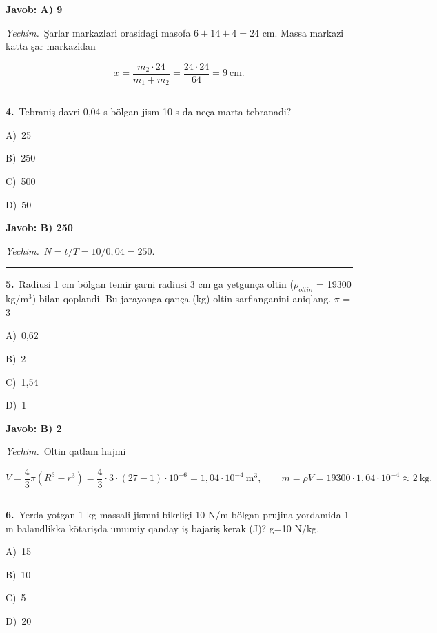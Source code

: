 \documentclass[11pt,a4paper]{article}
\newcommand{\opt}[2]{\hspace*{4mm}#1)\ #2\par}
\begin{document}
\noindent\colorbox{gray!12}{\parbox{\dimexpr\linewidth-2\fboxsep}{\textbf{Javob: A) 9}}}\par\smallskip
\noindent\textit{Yechim.}\ Şarlar markazlari orasidagi masofa $6+14+4=24$ cm. Massa markazi katta şar markazidan\par
\[x=\frac{m_2\cdot24}{m_1+m_2}=\frac{24\cdot24}{64}=9\ \text{cm}.\]\par\medskip\hrule\medskip
{}\noindent\begin{minipage}{\linewidth}
\textbf{4.}\ Tebraniş davri 0,04 s bölgan jism 10 s da neça marta tebranadi?\par\smallskip
\opt{A}{25}
\opt{B}{250}
\opt{C}{500}
\opt{D}{50}
\end{minipage}\vspace{2pt}\par
\noindent\colorbox{gray!12}{\parbox{\dimexpr\linewidth-2\fboxsep}{\textbf{Javob: B) 250}}}\par\smallskip
\noindent\textit{Yechim.}\ $N=t/T=10/0{,}04=250$.\par\par\medskip\hrule\medskip
{}\noindent\begin{minipage}{\linewidth}
\textbf{5.}\ Radiusi 1 cm bölgan temir şarni radiusi 3 cm ga yetgunça oltin ($\rho_{oltin}$ = 19300 kg/m$^{3}$) bilan qoplandi. Bu jarayonga qança (kg) oltin sarflanganini aniqlang. $\pi$ = 3\par\smallskip
\opt{A}{0,62}
\opt{B}{2}
\opt{C}{1,54}
\opt{D}{1}
\end{minipage}\vspace{2pt}\par
\noindent\colorbox{gray!12}{\parbox{\dimexpr\linewidth-2\fboxsep}{\textbf{Javob: B) 2}}}\par\smallskip
\noindent\textit{Yechim.}\ Oltin qatlam hajmi\par
\[V=\frac43\pi\left(R^3-r^3\right)=\frac43\cdot3\cdot(27-1)\cdot10^{-6}=1{,}04\cdot10^{-4}\ \text{m}^3,\qquad m=\rho V=19300\cdot1{,}04\cdot10^{-4}\approx2\ \text{kg}.\]\par\medskip\hrule\medskip
{}\noindent\begin{minipage}{\linewidth}
\textbf{6.}\ Yerda yotgan 1 kg massali jismni bikrligi 10 N/m bölgan prujina yordamida 1 m balandlikka kötarişda umumiy qanday iş bajariş kerak (J)? g=10 N/kg.\par\smallskip
\opt{A}{15}
\opt{B}{10}
\opt{C}{5}
\opt{D}{20}
\end{minipage}\vspace{2pt}\par
\end{document}
